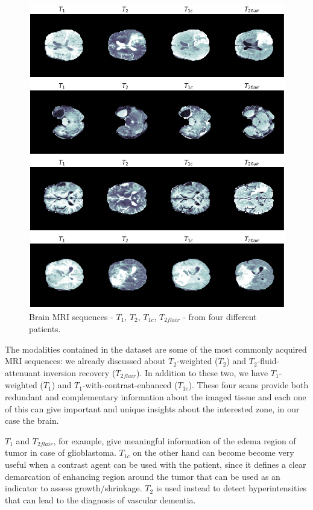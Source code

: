 \begin{figure}
\centering
\includegraphics[height=0.74\textheight]{images/all_sequences2.pdf}
\caption[The four MRI sequences: $T_{1}$, $T_{2}$, $T_{1\textit{c}}$, $T_{2\textit{flair}}$]{Brain MRI sequences - $T_{1}$, $T_{2}$, $T_{1\textit{c}}$, $T_{2\textit{flair}}$ - from four different patients.}
\label{fig:all_sequences}
\end{figure}

The modalities contained in the dataset are some of the most commonly acquired MRI sequences: we already discussed about $T_{2}$-weighted ($T_{2}$) and $T_{2}$-fluid-attenuant inversion recovery ($T_{2\textit{flair}}$). In addition to these two, we have $T_{1}$-weighted ($T_{1}$) and $T_{1}$-with-contrast-enhanced ($T_{1\textit{c}}$).
These four scans provide both redundant and complementary information about the imaged tissue and each one of this can give important and unique insights about the interested zone, in our case the brain.

\vspace{2mm} %
$T_{1}$ and $T_{2flair}$, for example, give meaningful information of the edema region of tumor in case of glioblastoma. $T_{1c}$ on the other hand can become become very useful when a contrast agent can be used with the patient, since it defines a clear demarcation of enhancing region around the tumor that can be used as an indicator to assess growth/shrinkage. $T_{2}$ is used instead to detect hyperintensities that can lead to the diagnosis of vascular dementia\cite{migan}.

